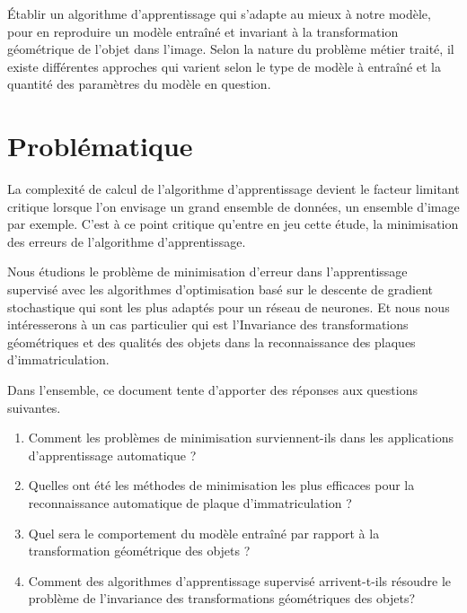 		Établir un algorithme d’apprentissage qui s'adapte au mieux à notre modèle, pour en reproduire un modèle entraîné et invariant à la transformation géométrique de l’objet dans l'image. Selon la nature du problème métier traité, il existe différentes approches qui varient selon le type de modèle à entraîné et la quantité des paramètres du modèle en question.
		
	
	\section{Problématique}
		La complexité de calcul de l'algorithme d'apprentissage devient le facteur limitant critique lorsque l'on envisage un grand ensemble de données, un ensemble d’image par exemple. C'est à ce point critique qu'entre en jeu cette étude, la minimisation des erreurs de l’algorithme d’apprentissage. 
		
		Nous étudions le problème de minimisation d’erreur dans l'apprentissage supervisé avec les algorithmes d’optimisation basé sur le descente de gradient stochastique qui sont les plus adaptés pour un réseau de neurones. Et nous nous intéresserons à un cas particulier qui est l’Invariance des transformations géométriques et des qualités des objets dans la  reconnaissance des plaques d'immatriculation.
		
		  
		
		
		
		
		Dans l'ensemble, ce document tente d'apporter des réponses aux questions suivantes.
		\begin{enumerate}
			\item Comment les problèmes de minimisation surviennent-ils dans les applications d'apprentissage automatique ?
			\item Quelles ont été les méthodes de minimisation les plus efficaces pour la reconnaissance automatique de plaque d’immatriculation ?
			\item Quel sera le comportement du  modèle entraîné par rapport à la transformation géométrique des objets ?
			
			\item Comment des algorithmes d'apprentissage supervisé arrivent-t-ils résoudre le problème de l’invariance des transformations géométriques des objets?
		\end{enumerate}
	
